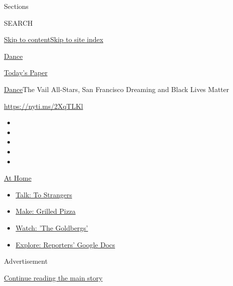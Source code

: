 Sections

SEARCH

\protect\hyperlink{site-content}{Skip to
content}\protect\hyperlink{site-index}{Skip to site index}

\href{https://www.nytimes.com/section/arts/dance}{Dance}

\href{https://myaccount.nytimes.com/auth/login?response_type=cookie\&client_id=vi}{}

\href{https://www.nytimes.com/section/todayspaper}{Today's Paper}

\href{/section/arts/dance}{Dance}\textbar{}The Vail All-Stars, San
Francisco Dreaming and Black Lives Matter

\url{https://nyti.ms/2XqTLKl}

\begin{itemize}
\item
\item
\item
\item
\item
\end{itemize}

\href{https://www.nytimes.com/spotlight/at-home?action=click\&pgtype=Article\&state=default\&region=TOP_BANNER\&context=at_home_menu}{At
Home}

\begin{itemize}
\tightlist
\item
  \href{https://www.nytimes.com/2020/08/03/well/family/the-benefits-of-talking-to-strangers.html?action=click\&pgtype=Article\&state=default\&region=TOP_BANNER\&context=at_home_menu}{Talk:
  To Strangers}
\item
  \href{https://www.nytimes.com/2020/08/01/at-home/coronavirus-make-pizza-on-a-grill.html?action=click\&pgtype=Article\&state=default\&region=TOP_BANNER\&context=at_home_menu}{Make:
  Grilled Pizza}
\item
  \href{https://www.nytimes.com/2020/07/31/arts/television/goldbergs-abc-stream.html?action=click\&pgtype=Article\&state=default\&region=TOP_BANNER\&context=at_home_menu}{Watch:
  'The Goldbergs'}
\item
  \href{https://www.nytimes.com/interactive/2020/at-home/even-more-reporters-editors-diaries-lists-recommendations.html?action=click\&pgtype=Article\&state=default\&region=TOP_BANNER\&context=at_home_menu}{Explore:
  Reporters' Google Docs}
\end{itemize}

Advertisement

\protect\hyperlink{after-top}{Continue reading the main story}

